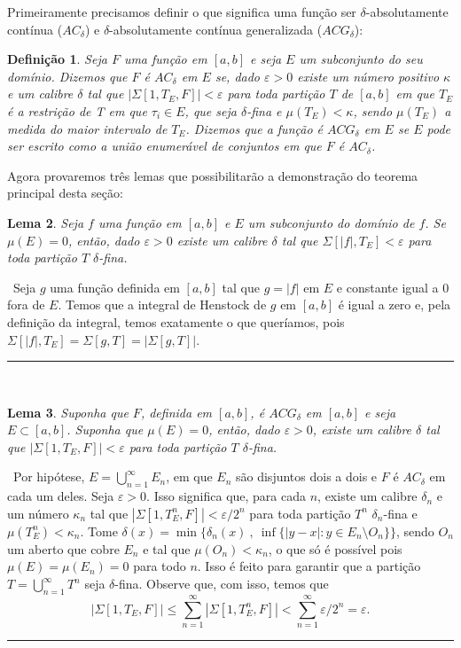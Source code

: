 \documentclass[12pt, a4paper]{article}
\newtheorem{mydef}{Definição}[section]
\newtheorem{lem}[mydef]{Lema}
\def\dem{\par\smallbreak\noindent {\textit{ Demonstração:}} \ }
\def\eop{\hfill\rule{2.5mm}{2.5mm}}
\theoremstyle{definition}
\begin{document}
Primeiramente precisamos definir o que significa uma função ser $\delta$-absolutamente contínua ($AC_\delta$) e  $\delta$-absolutamente contínua generalizada ($ACG_\delta$): 

\begin{mydef}
	
	Seja $F$ uma função em $[a,b]$ e seja $E$ um subconjunto do seu domínio. Dizemos que $F$ é $AC_\delta$ em $E$ se, dado $\varepsilon >0$ existe um número positivo $\kappa$ e um calibre $\delta$ tal que $|\Sigma[1,T_E,F]|<\varepsilon$ para toda partição $T$ de $[a,b]$ em que $T_E$ é a restrição de T em que $\tau_i \in E$, que seja $\delta$-fina e $\mu(T_E)<\kappa$, sendo $\mu(T_E)$ a medida do maior intervalo de $T_E$. Dizemos que a função é $ACG_\delta$ em $E$ se $E$ pode ser escrito como a união enumerável de conjuntos em que $F$ é $AC_\delta$.
	
\end{mydef}

Agora provaremos três lemas que possibilitarão a demonstração do teorema principal desta seção: 

\begin{lem}
	
	Seja $f$ uma função em $[a,b]$ e $E$ um subconjunto do domínio de $f$. Se $\mu (E)=0$, então, dado $\varepsilon >0$ existe um calibre $\delta$ tal que $\Sigma[|f|,T_E]<\varepsilon$ para toda partição $T$ $\delta$-fina. 
	
\end{lem}

\dem Seja $g$ uma função definida em $[a,b]$ tal que $g=|f|$ em $E$ e constante igual a $0$ fora de $E$. Temos que a integral de Henstock de $g$ em $[a,b]$ é igual a zero e, pela definição da integral, temos exatamente o que queríamos, pois $\Sigma[|f|,T_E]=\Sigma[g,T]=|\Sigma[g,T]|$.  \eop \\

\begin{lem}
	
	Suponha que $F$, definida em $[a,b]$, é $ACG_\delta$ em $ [a,b]$ e seja $E\subset [a,b]$. Suponha que $\mu(E)=0$, então, dado $\varepsilon >0$, existe um calibre $\delta$ tal que $|\Sigma[1,T_E,F]|<\varepsilon$ para toda partição $T$ $\delta$-fina.   	

\end{lem}

\dem Por hipótese, $E=\bigcup_{n=1}^\infty E_n$, em que $E_n$ são disjuntos dois a dois e $F$ é $AC_\delta$ em cada um deles. Seja $\varepsilon >0$. Isso significa que, para cada $n$, existe um calibre $\delta_n$ e um número $\kappa_n$ tal que  $|\Sigma[1,T_E^n,F]|<\varepsilon /2^n$ para toda partição $T^n$ $\delta_n$-fina e $\mu(T_E^n)<\kappa_n$. Tome $\delta (x)=\min \{ \delta_n(x) \ , \ \inf \{|y-x| : y\in E_n \setminus O_n \}  \}$, sendo $O_n$ um aberto que cobre $E_n$ e tal que $\mu (O_n)< \kappa_n$, o que só é possível pois $\mu(E)=\mu(E_n)=0$ para todo $n$. Isso é feito para garantir que a partição $T=\bigcup_{n=1}^\infty T^n$ seja $\delta$-fina. Observe que, com isso, temos que $$|\Sigma[1,T_E,F]|\leq \sum_{n=1}^\infty |\Sigma[1,T_E^n,F]|< \sum_{n=1}^\infty \varepsilon /2^n=\varepsilon.$$  \eop \\
\end{document}
